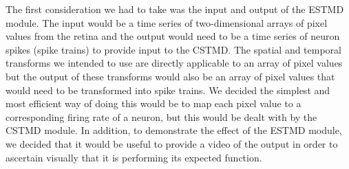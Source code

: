 \documentclass[a4paper,11pt]{article}
\begin{document}
The first consideration we had to take was the input and output of the ESTMD module. The input would be a time series of two-dimensional arrays of pixel values from the retina and the output would need to be a time series of neuron spikes (spike trains) to provide input to the CSTMD. The spatial and temporal transforms we intended to use are directly applicable to an array of pixel values but the output of these transforms would also be an array of pixel values that would need to be transformed into spike trains. We decided the simplest and most efficient way of doing this would be to map each pixel value to a corresponding firing rate of a neuron, but this would be dealt with by the CSTMD module. In addition, to demonstrate the effect of the ESTMD module, we decided that it would be useful to provide a video of the output in order to ascertain visually that it is performing its expected function.
\end{document}
